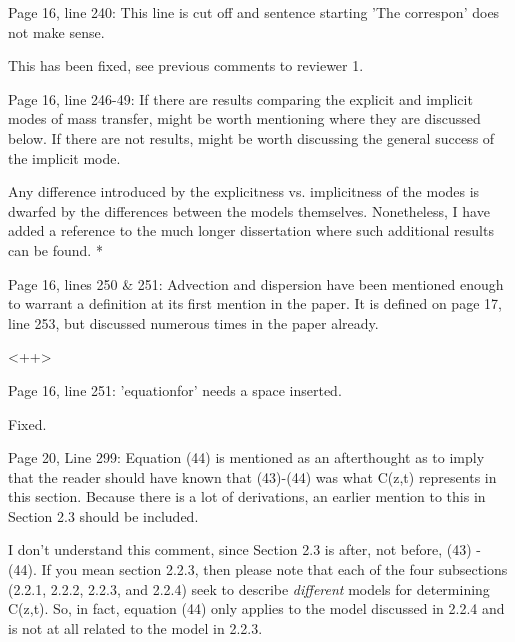\documentclass[answers,12pt]{exam}
\begin{document}
\begin{questions}
\question Page 16, line 240: This line is cut off and sentence starting 'The correspon' does not make sense. 
\begin{solution}
This has been fixed, see previous comments to reviewer 1.
\end{solution} 
 
\question Page  16,  line  246-49:  If  there  are  results  comparing  the  explicit  and  implicit  modes  of  mass  transfer,  might  be  worth  mentioning  where  they  are  discussed  below.  If  there  are  not  results,  might  be  worth 
discussing the general success of the implicit mode. 
\begin{solution}
Any difference introduced by the explicitness vs. implicitness of the modes is 
        dwarfed by the differences between the models themselves. Nonetheless, 
        I have added a reference to the much longer dissertation where such 
        additional results can be found. 
        {\color{red} *} 
\end{solution} 
 
\question Page  16,  lines  250 \& 251: Advection and dispersion have been mentioned enough to warrant a definition 
at  its  first  mention  in  the  paper.  It  is  defined  on  page  17,  line  253,  but  discussed numerous times in the 
paper already.  
\begin{solution}
<++>
\end{solution} 
 
\question Page 16, line 251: 'equationfor' needs a space inserted.  
\begin{solution}
Fixed.
\end{solution} 
 
\question Page  20,  Line  299:  Equation (44) is mentioned as an afterthought as to imply that the reader should have 
known  that  (43)-(44)  was  what  C(z,t)  represents  in  this  section.  Because  there  is  a  lot  of  derivations,  an 
earlier mention to this in Section 2.3 should be included.  
\begin{solution}
        I don't understand this comment, since Section 2.3 is after, not 
        before, (43) - (44). If you mean section 2.2.3, then please note that 
        each of the four subsections (2.2.1, 2.2.2, 2.2.3, and 2.2.4) seek to 
        describe \emph{different} models for determining C(z,t). So, in fact, 
        equation (44) only applies to the model discussed in 2.2.4 and is not 
        at all related to the model in 2.2.3.
\end{solution} 
 

\end{questions}
\end{document}
